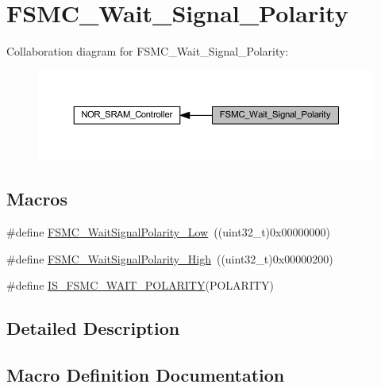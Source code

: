 \hypertarget{group___f_s_m_c___wait___signal___polarity}{}\section{F\+S\+M\+C\+\_\+\+Wait\+\_\+\+Signal\+\_\+\+Polarity}
\label{group___f_s_m_c___wait___signal___polarity}
Collaboration diagram for F\+S\+M\+C\+\_\+\+Wait\+\_\+\+Signal\+\_\+\+Polarity\+:
\nopagebreak
\begin{figure}[H]
\begin{center}
\leavevmode
\includegraphics[width=350pt]{group___f_s_m_c___wait___signal___polarity}
\end{center}
\end{figure}
\subsection*{Macros}
\begin{DoxyCompactItemize}
\item 
\#define \hyperlink{group___f_s_m_c___wait___signal___polarity_ga7dc72fdfc6225e5daa9b8efee8dff49f}{F\+S\+M\+C\+\_\+\+Wait\+Signal\+Polarity\+\_\+\+Low}~((uint32\+\_\+t)0x00000000)
\item 
\#define \hyperlink{group___f_s_m_c___wait___signal___polarity_ga3418f29249a261edb1359d1bcdc43661}{F\+S\+M\+C\+\_\+\+Wait\+Signal\+Polarity\+\_\+\+High}~((uint32\+\_\+t)0x00000200)
\item 
\#define \hyperlink{group___f_s_m_c___wait___signal___polarity_gabc5321807d5184fe5cdb7848e1be7bc6}{I\+S\+\_\+\+F\+S\+M\+C\+\_\+\+W\+A\+I\+T\+\_\+\+P\+O\+L\+A\+R\+I\+TY}(P\+O\+L\+A\+R\+I\+TY)
\end{DoxyCompactItemize}


\subsection{Detailed Description}


\subsection{Macro Definition Documentation}
\mbox{\label{group___f_s_m_c___wait___signal___polarity_ga3418f29249a261edb1359d1bcdc43661}} 
